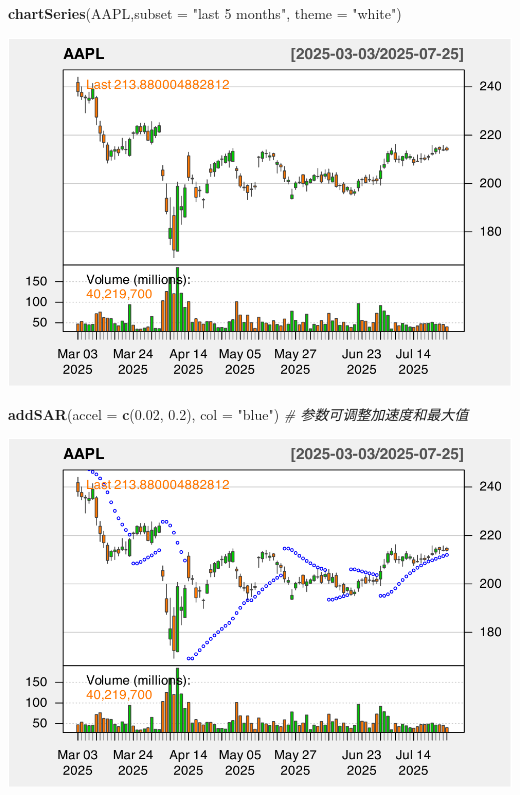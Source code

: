 \documentclass[]{ctexbook}
\newenvironment{Shaded}{\begin{snugshade}}{\end{snugshade}}
\newcommand{\AttributeTok}[1]{\textcolor[rgb]{0.13,0.29,0.53}{#1}}
\newcommand{\CommentTok}[1]{\textcolor[rgb]{0.56,0.35,0.01}{\textit{#1}}}
\newcommand{\FloatTok}[1]{\textcolor[rgb]{0.00,0.00,0.81}{#1}}
\newcommand{\FunctionTok}[1]{\textcolor[rgb]{0.13,0.29,0.53}{\textbf{#1}}}
\newcommand{\NormalTok}[1]{#1}
\newcommand{\StringTok}[1]{\textcolor[rgb]{0.31,0.60,0.02}{#1}}
\begin{document}
\begin{Shaded}
\begin{Highlighting}[]
\FunctionTok{chartSeries}\NormalTok{(AAPL,}\AttributeTok{subset =} \StringTok{"last 5 months"}\NormalTok{, }\AttributeTok{theme =} \StringTok{"white"}\NormalTok{)}
\end{Highlighting}
\end{Shaded}

\includegraphics[width=0.9\linewidth]{QuantmodHandbook_files/figure-latex/sar-1}

\begin{Shaded}
\begin{Highlighting}[]
\FunctionTok{addSAR}\NormalTok{(}\AttributeTok{accel =} \FunctionTok{c}\NormalTok{(}\FloatTok{0.02}\NormalTok{, }\FloatTok{0.2}\NormalTok{), }\AttributeTok{col =} \StringTok{"blue"}\NormalTok{)  }\CommentTok{\# 参数可调整加速度和最大值}
\end{Highlighting}
\end{Shaded}

\includegraphics[width=0.9\linewidth]{QuantmodHandbook_files/figure-latex/sar-2}
\end{document}
